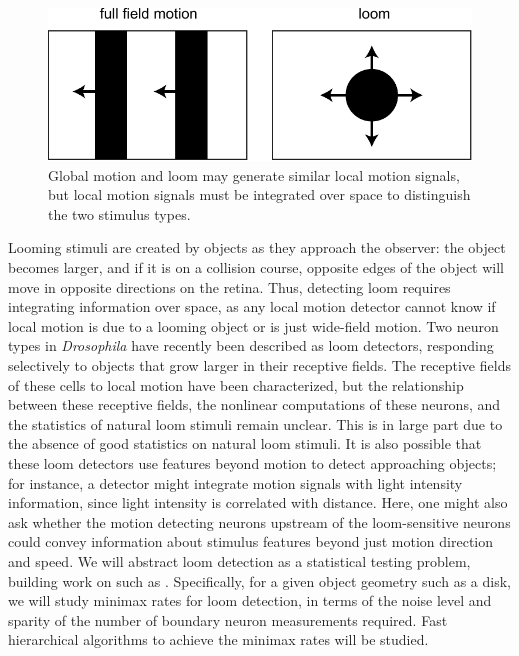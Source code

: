 \setlength{\columnsep}{10pt}
\begin{figure}
\centering
\includegraphics[width=.44\textwidth]{figs/loom}
\caption{\small Global motion and loom may generate similar local
motion signals, but local motion signals must be integrated over space
to distinguish the two stimulus types.}
    \label{fig:loom}
\vskip-2pt
\end{figure}

Looming stimuli are created by objects as they approach the observer:
the object becomes larger, and if it is on a collision course,
opposite edges of the object will move in opposite directions on the
retina. Thus, detecting loom requires integrating information over
space, as any local motion detector cannot know if local motion is due
to a looming object or is just wide-field motion. Two neuron types in
\textit{Drosophila} have recently been described as loom detectors,
responding selectively to objects that grow larger in their receptive
fields. The receptive fields of these cells to local motion have been
characterized, but the relationship between these receptive fields,
the nonlinear computations of these neurons, and the statistics of
natural loom stimuli remain unclear. This is in large part due to the
absence of good statistics on natural loom stimuli. It is also
possible that these loom detectors use features beyond motion to
detect approaching objects; for instance, a detector might integrate
motion signals with light intensity information, since light intensity
is correlated with distance. Here, one might also ask whether the
motion detecting neurons upstream of the loom-sensitive neurons could
convey information about stimulus features beyond just motion
direction and speed. We will abstract loom detection as a statistical
testing problem, building work on such
as \citep{castro:05,huo:06,hc:04}.  Specifically, for a given object
geometry such as a disk, we will study minimax rates for loom
detection, in terms of the noise level and sparity of the number of
boundary neuron measurements required. Fast hierarchical algorithms
to achieve the minimax rates will be studied.



